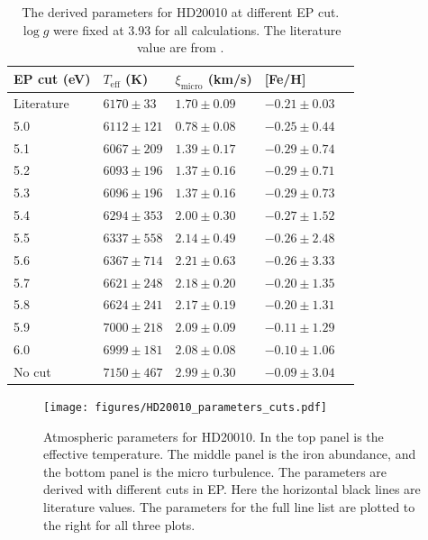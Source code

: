 \documentclass{aa}
\begin{document}
\begin{table}[htb!]
    \caption{The derived parameters for HD20010 at different EP cut. $\log g$
        were fixed at 3.93 for all calculations. The literature value are from \cite{Santos2004}.}
    \label{tab:hd20010}
    \centering
    \begin{tabular}{lllll}
      \hline\hline
        EP cut (eV) & $T_\mathrm{eff}$ (K) & $\xi_\mathrm{micro}$ (km/s) & [Fe/H]               \\
      \hline
        Literature  & $6170 \pm  33$       & $1.70 \pm 0.09$             & $-0.21 \pm 0.03$      \\
      \hline
        5.0         & $6112 \pm 121$       & $0.78 \pm 0.08$             & $-0.25 \pm 0.44$      \\
        5.1         & $6067 \pm 209$       & $1.39 \pm 0.17$             & $-0.29 \pm 0.74$      \\
        5.2         & $6093 \pm 196$       & $1.37 \pm 0.16$             & $-0.29 \pm 0.71$      \\
        5.3         & $6096 \pm 196$       & $1.37 \pm 0.16$             & $-0.29 \pm 0.73$      \\
        5.4         & $6294 \pm 353$       & $2.00 \pm 0.30$             & $-0.27 \pm 1.52$      \\
        5.5         & $6337 \pm 558$       & $2.14 \pm 0.49$             & $-0.26 \pm 2.48$      \\
        5.6         & $6367 \pm 714$       & $2.21 \pm 0.63$             & $-0.26 \pm 3.33$      \\
        5.7         & $6621 \pm 248$       & $2.18 \pm 0.20$             & $-0.20 \pm 1.35$      \\
        5.8         & $6624 \pm 241$       & $2.17 \pm 0.19$             & $-0.20 \pm 1.31$      \\
        5.9         & $7000 \pm 218$       & $2.09 \pm 0.09$             & $-0.11 \pm 1.29$      \\
        6.0         & $6999 \pm 181$       & $2.08 \pm 0.08$             & $-0.10 \pm 1.06$      \\
        No cut      & $7150 \pm 467$       & $2.99 \pm 0.30$             & $-0.09 \pm 3.04$      \\
      \hline
    \end{tabular}
\end{table}



\begin{figure}[tpb!]
    \centering
    \texttt{[image: figures/HD20010\_parameters\_cuts.pdf]}
    \caption{Atmospheric parameters for HD20010. In the top panel is
    the effective temperature. The middle panel is the iron abundance,
    and the bottom panel is the micro turbulence. The parameters are
    derived with different cuts in EP. Here the horizontal black lines
    are literature values. The parameters for the full line list are
    plotted to the right for all three plots.}
    \label{fig:HD20010_parameters_cuts}
\end{figure}
\end{document}
